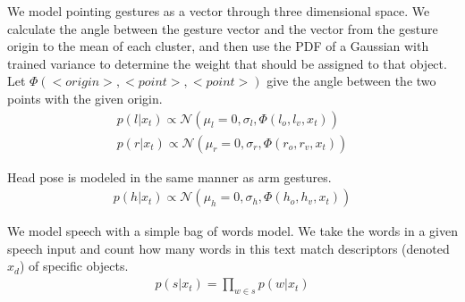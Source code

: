 \documentclass[letterpaper, 10 pt, conference]{ieeeconf}
\newcommand{\menote}[1]{\textcolor{Red}{\textbf{ME: #1}}}
\begin{document}
  We model pointing gestures as a vector through three
dimensional space. We calculate the angle between the gesture vector
and the vector from the gesture origin to the mean of each cluster,
and then use the PDF of a Gaussian with trained variance to determine
the weight that should be assigned to that object. Let $\Phi(<origin>,
<point>, <point>)$ give the angle between the two points with the
given origin.
\begin{align}
p(l | x_t) \propto \mathcal{N}(\mu_l=0, \sigma_l,\Phi(l_o, l_v, x_t))\\
p(r | x_t) \propto \mathcal{N}(\mu_r=0, \sigma_r,\Phi(r_o, r_v, x_t))
\end{align}

Head pose is modeled in the same manner as arm gestures.
\begin{align}
p(h | x_t) \propto \mathcal{N}(\mu_h=0, \sigma_h,\Phi(h_o, h_v, x_t))
\end{align}




We model speech with a simple bag of words model. We take the words in a given speech input and count how many words in this text match descriptors (denoted  $x_d$) of specific objects.
\begin{align}
p(s |x_t) = \displaystyle \prod_{w \in s} p(w | x_t)
\end{align}
\end{document}
